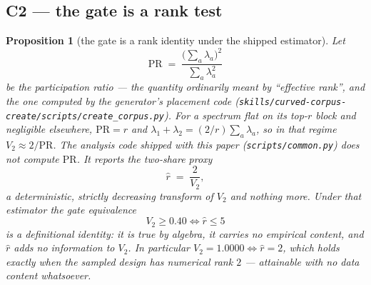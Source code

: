 \documentclass[11pt,a4paper]{article}
\theoremstyle{plain}
\newtheorem{proposition}{Proposition}
\theoremstyle{remark}
\theoremstyle{plain}
\begin{document}
\subsection{C2 --- the gate is a rank test}
\label{sec:c2}

\begin{proposition}[the gate is a rank identity under the shipped estimator]
\label{prop:gate}
Let
\begin{equation}
\mathrm{PR}\;=\;\frac{\big(\sum_a\lambda_a\big)^2}{\sum_a\lambda_a^2}
\label{eq:participation}
\end{equation}
be the participation ratio --- the quantity ordinarily meant by ``effective rank'', and the one computed by the generator's placement code (\texttt{skills/curved-corpus-create/scripts/create\_corpus.py}). For a spectrum flat on its top-$r$ block and negligible elsewhere, $\mathrm{PR}=r$ and $\lambda_1+\lambda_2=(2/r)\sum_a\lambda_a$, so in that regime $V_2\approx2/\mathrm{PR}$. The analysis code shipped with this paper (\texttt{scripts/common.py}) does \emph{not} compute $\mathrm{PR}$. It reports the two-share proxy
\begin{equation}
\hat r\;=\;\frac{2}{V_2},
\label{eq:reffproxy}
\end{equation}
a deterministic, strictly decreasing transform of $V_2$ and nothing more. Under that estimator the gate equivalence
\begin{equation}
V_2\ge0.40\iff\hat r\le5
\label{eq:gate-rank}
\end{equation}
is a \emph{definitional identity}: it is true by algebra, it carries no empirical content, and $\hat r$ adds no information to $V_2$. In particular $V_2=1.0000\iff\hat r=2$, which holds exactly when the sampled design has numerical rank $2$ --- attainable with no data content whatsoever.
\end{proposition}
\end{document}
